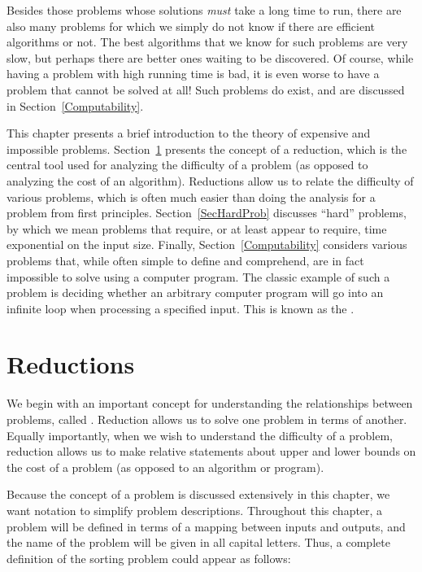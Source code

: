 Besides those problems whose solutions \emph{must} take a long time to
run, there are also many problems for which we simply do not know if
there are efficient algorithms or not.
The best algorithms that we know for such problems are very slow, but
perhaps there are better ones waiting to be discovered.
Of course, while having a problem with high running time is bad, it is
even worse to have a problem that cannot be solved at all!
Such problems do exist, and are discussed in
Section~\ref{Computability}.

This chapter presents a brief introduction to the theory of
expensive and impossible problems.
Section~\ref{ReductSec} presents the concept of a reduction, which is
the central tool used for analyzing the difficulty of a problem
(as opposed to analyzing the cost of an algorithm).
Reductions allow us to relate the difficulty of various problems,
which is often much easier than doing the analysis for a problem from
first principles.
Section~\ref{SecHardProb} discusses ``hard'' problems, by which we
mean problems that require, or at least appear to require,
time exponential on the input size.
Finally, Section~\ref{Computability} considers various problems that,
while often simple to define and comprehend, are in fact impossible to 
solve using a computer program.
The classic example of such a problem is deciding whether an arbitrary 
computer program will go into an infinite loop when processing a
specified input.
This is known as the .

\section{Reductions}
\label{ReductSec}

We  begin with an important concept for
understanding the relationships between problems, called
.
Reduction allows us to solve one problem in terms of another.
Equally importantly, when we wish to understand the difficulty of a
problem, reduction allows us to make relative statements about
upper and lower bounds on the cost of a problem (as opposed to an
algorithm or program).

Because the concept of a problem is discussed extensively in this
chapter, we want notation to simplify problem descriptions.
Throughout this chapter, a problem will be defined in terms of a
mapping between inputs and outputs, and the name of the problem will
be given in all capital letters.
Thus, a complete definition of the sorting problem could appear as
follows:

